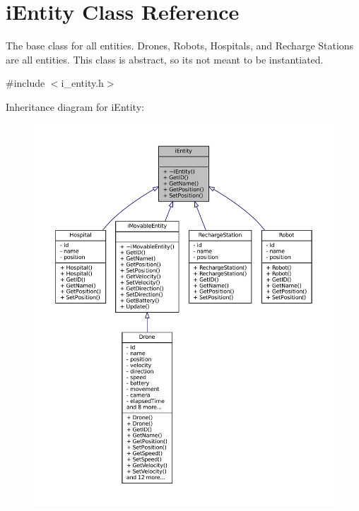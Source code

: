 \hypertarget{classiEntity}{}\section{i\+Entity Class Reference}
\label{classiEntity}


The base class for all entities. Drones, Robots, Hospitals, and Recharge Stations are all entities. This class is abstract, so it\textquotesingle{}s not meant to be instantiated.  




{\ttfamily \#include $<$i\+\_\+entity.\+h$>$}



Inheritance diagram for i\+Entity\+:\nopagebreak
\begin{figure}[H]
\begin{center}
\leavevmode
\includegraphics[width=350pt]{classiEntity__inherit__graph}
\end{center}
\end{figure}


